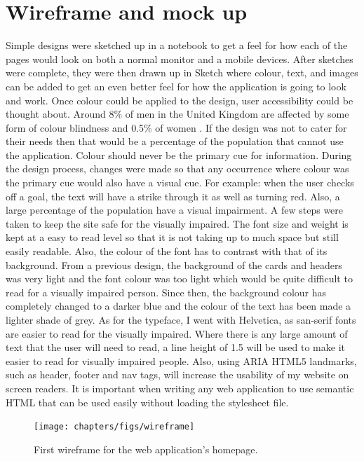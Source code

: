 \section{Wireframe and mock up}
Simple designs were sketched up in a notebook to get a feel for how each of the pages would look on both a normal monitor and a mobile devices. After sketches were complete, they were then drawn up in Sketch \citep{sketch:2013} where colour, text, and images can be added to get an even better feel for how the application is going to look and work. Once colour could be applied to the design, user accessibility could be thought about. Around 8\% of men in the United Kingdom are affected by some form of colour blindness and 0.5\% of women \citep{colourBlind}. If the design was not to cater for their needs then that would be a percentage of the population that cannot use the application. Colour should never be the primary cue for information. During the design process, changes were made so that any occurrence where colour was the primary cue would also have a visual cue. For example: when the user checks off a goal, the text will have a strike through it as well as turning red. Also, a large percentage of the population have a visual impairment. A few steps were taken to keep the site safe for the visually impaired. The font size and weight is kept at a easy to read level so that it is not taking up to much space but still easily readable. Also, the colour of the font has to contrast with that of its background. From a previous design, the background of the cards and headers was very light and the font colour was too light which would be quite difficult to read for a visually impaired person. Since then, the background colour has completely changed to a darker blue and the colour of the text has been made a lighter shade of grey. As for the typeface, I went with Helvetica, as san-serif fonts are easier to read for the visually impaired. Where there is any large amount of text that the user will need to read, a line height of 1.5 will be used to make it easier to read for visually impaired people. Also, using ARIA HTML5 landmarks, such as header, footer and nav tags, will increase the usability of my website on screen readers. It is important when writing any web application to use semantic HTML that can be used easily without loading the stylesheet file.\\

\begin{figure}[!ht]
\centering
\texttt{[image: chapters/figs/wireframe]}
\caption{First wireframe for the web application's homepage.}
\label{fig:erd}
\end{figure}

